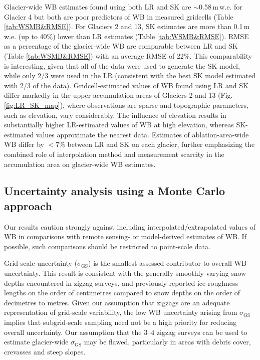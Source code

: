\documentclass[twocolumn, letterpaper]{igs}
\begin{document}
Glacier-wide WB estimates found using both LR and SK are $\sim$0.58\,m\,w.e. for Glacier 4 but both are poor predictors of  WB in measured gridcells (Table \ref{tab:WSMB&RMSE}). For Glaciers 2 and 13, SK estimates are more than 0.1\,m\,w.e. (up to 40\%) lower than LR estimates (Table \ref{tab:WSMB&RMSE}). RMSE as a percentage of the glacier-wide WB are comparable between LR and SK (Table \ref{tab:WSMB&RMSE}) with an average RMSE of 22\%. This comparability is interesting, given that all of the data were used to generate the SK model, while only 2/3 were used in the LR (consistent with the best SK model estimated with 2/3 of the data). Gridcell-estimated values of WB found using LR and SK differ markedly in the upper accumulation areas of Glaciers 2 and 13 (Fig. \ref{fig:LR_SK_map}), where observations are sparse and topographic parameters, such as elevation, vary considerably. The influence of elevation results in substantially higher LR-estimated values of WB at high elevation, whereas SK-estimated values approximate the nearest data. Estimates of ablation-area-wide WB differ by $<$7\% between LR and SK on each glacier, further emphasizing the combined role of interpolation method and measurement scarcity in the accumulation area on glacier-wide WB estimates.


\subsection{Uncertainty analysis using a Monte Carlo approach}

Our results caution strongly against including interpolated/extrapolated values of WB in comparisons with remote sensing- or model-derived estimates of WB. If possible, such comparisons should be restricted to point-scale data. 

Grid-scale uncertainty ($\sigma_{\mathrm{GS}}$) is the smallest assessed contributor to overall WB uncertainty. This result is consistent with the generally smoothly-varying snow depths encountered in zigzag surveys, and previously reported ice-roughness lengths on the order of centimetres \citep[e.g.][]{Hock2005} compared to snow depths on the order of decimetres to metres. Given our assumption that zigzags are an adequate representation of grid-scale variability, the low WB uncertainty arising from $\sigma_{\mathrm{GS}}$ implies that subgrid-scale sampling need not be a high priority for reducing overall uncertainty. Our assumption that the 3--4 zigzag surveys can be used to estimate glacier-wide $\sigma_{\mathrm{GS}}$ may be flawed, particularly in areas with debris cover, crevasses and steep slopes.
\end{document}
